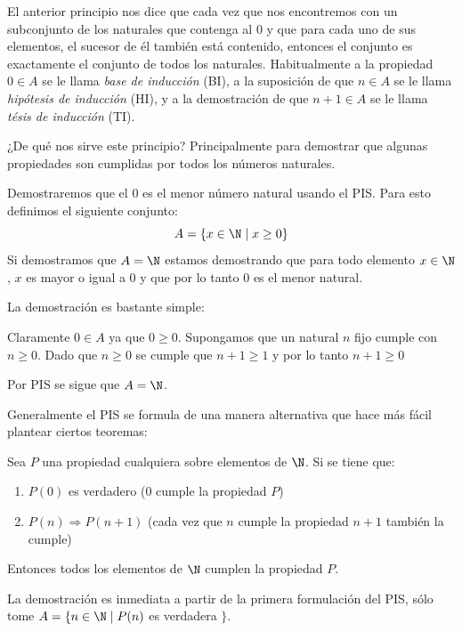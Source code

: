 El anterior principio nos dice que cada vez que nos encontremos con un subconjunto de los naturales que contenga al $0$ y que para cada uno de sus elementos, el sucesor de él también está contenido, entonces el conjunto es exactamente el conjunto de todos los naturales.
Habitualmente a la propiedad $0\in A$ se le llama \emph{base de inducción} (BI), a la suposición de que $n\in A$ se le llama \emph{hipótesis de inducción} (HI), y a la demostración de que $n+1\in A$ se le llama \emph{tésis de inducción} (TI).

¿De qué nos sirve este principio?
Principalmente para demostrar que algunas propiedades son cumplidas por todos los números naturales.

\begin{ejemplo}
Demostraremos que el $0$ es el menor número natural usando el PIS.
Para esto definimos el siguiente conjunto:
\[
A=\{x\in\N\;|\;x\geq 0\}
\]
Si demostramos que $A=\N$ estamos demostrando que para todo elemento $x\in\N$, $x$ es mayor o igual a $0$ y que por lo tanto $0$ es el menor natural.

\begin{demostracion}
La demostración es bastante simple:
\begin{inducciondemo}
\BI Claramente $0\in A$ ya que $0\geq 0$.
\HI Supongamos que un natural $n$ fijo cumple con $n\geq 0$.
\TI Dado que $n\geq 0$ se cumple que $n+1\geq 1$ y por lo tanto $n+1\geq 0$
\end{inducciondemo}
Por PIS se sigue que $A=\N$.
\end{demostracion}
\end{ejemplo}

Generalmente el PIS se formula de una manera alternativa que hace más fácil plantear ciertos teoremas:

\begin{teorema}
Sea $P$ una propiedad cualquiera sobre elementos de $\N$.
Si se tiene que:
\begin{enumerate}
\item $P(0)$ es verdadero ($0$ cumple la propiedad $P$)
\item $P(n)\Rightarrow P(n+1)$ (cada vez que $n$ cumple la propiedad $n+1$ también la cumple)
\end{enumerate}
Entonces todos los elementos de $\N$ cumplen la propiedad $P$.

\begin{demostracion}
La demostración es inmediata a partir de la primera formulación del PIS, sólo tome $A=\{n\in\N\;|\; P(n)$ es verdadera $\}$.
\end{demostracion}
\end{teorema}


